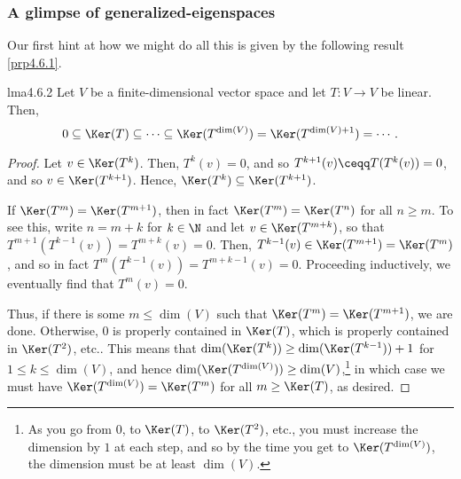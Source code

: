 \subsubsection{A glimpse of generalized-eigenspaces}

Our first hint at how we might do all this is given by the following result \cref{prp4.6.1}.
\begin{prp}{}{lma4.6.2}
	Let $V$ be a finite-dimensional vector space and let $T\colon V\rightarrow V$ be linear.  Then,
	\begin{equation}
	0\subseteq \Ker (T)\subseteq \cdots \subseteq \Ker (T^{\dim (V)})=\Ker (T^{\dim (V)+1})=\cdots .
	\end{equation}
	\begin{proof}
		Let $v\in \Ker (T^k)$.  Then, $T^k(v)=0$, and so $T^{k+1}(v)\ceqq T(T^k(v))=0$, and so $v\in \Ker (T^{k+1})$.  Hence, $\Ker (T^k)\subseteq \Ker (T^{k+1})$.
		
		If $\Ker (T^m)=\Ker (T^{m+1})$, then in fact $\Ker (T^m)=\Ker (T^n)$ for all $n\geq m$.  To see this, write $n=m+k$ for $k\in \N$ and let $v\in \Ker (T^{m+k})$, so that $T^{m+1}(T^{k-1}(v))=T^{m+k}(v)=0$.  Then, $T^{k-1}(v)\in \Ker (T^{m+1})=\Ker (T^m)$, and so in fact $T^m(T^{k-1}(v))=T^{m+k-1}(v)=0$.  Proceeding inductively, we eventually find that $T^m(v)=0$.
		
		Thus, if there is some $m\leq \dim (V)$ such that $\Ker (T^m)=\Ker (T^{m+1})$, we are done.  Otherwise, $0$ is properly contained in $\Ker (T)$, which is properly contained in $\Ker (T^2)$, etc..  This means that $\dim (\Ker (T^k))\geq \dim (\Ker (T^{k-1}))+1$ for $1\leq k\leq \dim (V)$, and hence $\dim (\Ker (T^{\dim (V)}))\geq \dim (V)$,\footnote{As you go from $0$, to $\Ker (T)$, to $\Ker (T^2)$, etc., you must increase the dimension by $1$ at each step, and so by the time you get to $\Ker (T^{\dim (V)})$, the dimension must be at least $\dim (V)$.} in which case we must have $\Ker (T^{\dim (V)})=\Ker (T^m)$ for all $m\geq \Ker (T)$, as desired.
	\end{proof}
\end{prp}
